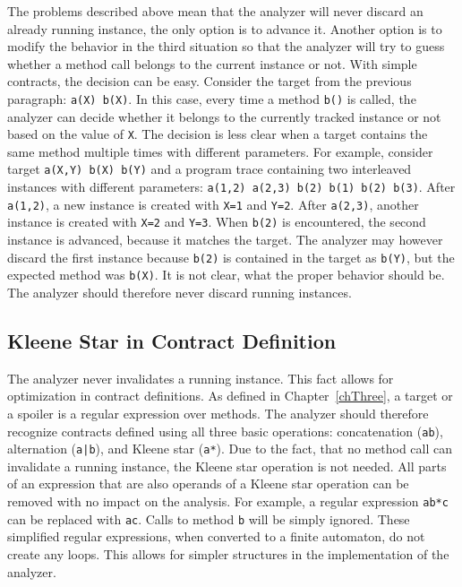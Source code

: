 The problems described above mean that the analyzer will never discard an
already running instance, the only option is to advance it. Another option is to
modify the behavior in the third situation so that the analyzer will try to
guess whether a method call belongs to the current instance or not. With simple
contracts, the decision can be easy. Consider the target from the previous
paragraph: \texttt{a(X) b(X)}. In this case, every time a method \texttt{b()} is
called, the analyzer can decide whether it belongs to the currently tracked
instance or not based on the value of \texttt{X}. The decision is less clear
when a target contains the same method multiple times with different parameters.
For example, consider target \texttt{a(X,Y) b(X) b(Y)} and a program trace
containing two interleaved instances with different parameters: \texttt{a(1,2)
a(2,3) b(2) b(1) b(2) b(3)}. After \texttt{a(1,2)}, a new instance is created
with \texttt{X=1} and \texttt{Y=2}. After \texttt{a(2,3)}, another instance is
created with \texttt{X=2} and \texttt{Y=3}. When \texttt{b(2)} is encountered,
the second instance is advanced, because it matches the target. The analyzer may
however discard the first instance because \texttt{b(2)} is contained in the
target as \texttt{b(Y)}, but the expected method was \texttt{b(X)}. It is not
clear, what the proper behavior should be. The analyzer should therefore never
discard running instances.

\subsection{Kleene Star in Contract Definition}

The analyzer never invalidates a running instance. This fact allows for
optimization in contract definitions. As defined in Chapter~\ref{chThree}, a
target or a spoiler is a regular expression over methods. The analyzer should
therefore recognize contracts defined using all three basic operations:
concatenation (\texttt{ab}), alternation (\texttt{a|b}), and Kleene star
(\texttt{a*}). Due to the fact, that no method call can invalidate a running
instance, the Kleene star operation is not needed. All parts of an expression
that are also operands of a Kleene star operation can be removed with no impact
on the analysis. For example, a regular expression \texttt{ab*c} can be replaced
with \texttt{ac}. Calls to method \texttt{b} will be simply ignored. These
simplified regular expressions, when converted to a finite automaton, do not
create any loops. This allows for simpler structures in the implementation of
the analyzer.


